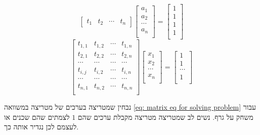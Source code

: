 \documentclass[12pt,twoside]{article}
\begin{document}
\begin{equation*}
    \begin{bmatrix}
        t_1 & t_2 & \cdots & t_n
    \end{bmatrix}
    \begin{bmatrix}
        a_1 \\
        a_2 \\
        \cdots \\
        a_n \\
    \end{bmatrix}
    =
    \begin{bmatrix}
        1 \\
        1 \\
        1 \\
        1 \\
    \end{bmatrix}
\end{equation*}
\begin{equation}
    \label{eq: matrix eq for solving problem}
    \begin{bmatrix}
        t_{1,1} & t_{1,2} & \cdots & t_{1,n} \\
        t_{2,1} & t_{2,2} & \cdots & t_{2,n} \\
        \cdots & \cdots & \cdots & \cdots\\
        t_{i,j} & t_{i,2} & \cdots & t_{i,n} \\
        \cdots & \cdots & \cdots & \cdots\\
        t_{n,1} & t_{n,2} & \cdots & t_{n,n} \\
    \end{bmatrix}
    \begin{bmatrix}
        x_1 \\
        x_2 \\
        \cdots \\
        x_n \\
    \end{bmatrix}
    = 
    \begin{bmatrix}
        1 \\
        1 \\
        \cdots \\
        1 \\
    \end{bmatrix}
\end{equation}

נבחין שמטריצה בערכים של 
מטריצה במשוואה 
\ref{eq: matrix eq for solving problem}
עבור משחק על גרף.
נשים לב שמטריצה
מטריצה מקבלת ערכים שהם 
$1$
לצמתים שהם שכנים או לעצמם
לכן נגדיר אותה כך.
\end{document}
